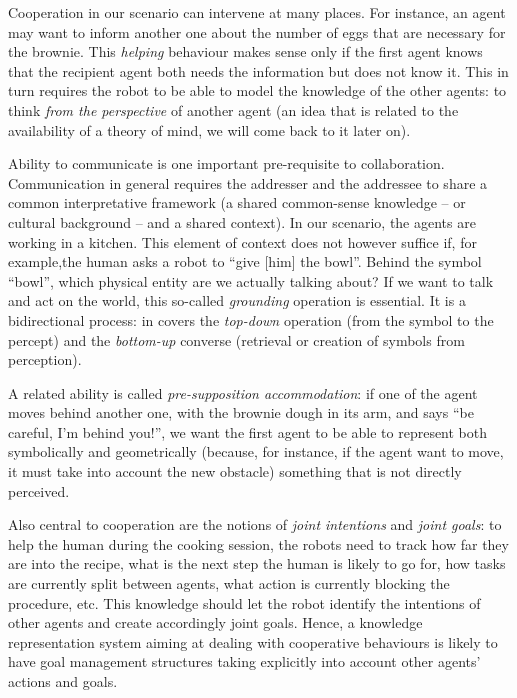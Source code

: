 Cooperation in our scenario can intervene at many places. For instance, an
agent may want to inform another one about the number of eggs that are
necessary for the brownie. This \emph{helping} behaviour makes sense only if
the first agent knows that the recipient agent both needs the information but
does not know it. This in turn requires the robot to be able to model the
knowledge of the other agents: to think \emph{from the perspective} of another
agent (an idea that is related to the availability of a theory of mind, we will
come back to it later on).

Ability to communicate is one important pre-requisite to collaboration.
Communication in general requires the addresser and the addressee to share a
common interpretative framework (a shared common-sense knowledge -- or cultural
background -- and a shared context). In our scenario, the agents are working in
a kitchen. This element of context does not however suffice if, for example,the 
human asks a robot to ``give {[him]} the bowl''. Behind the symbol
``bowl'', which physical entity are we actually talking about? If we want to
talk and act on the world, this so-called \emph{grounding} operation is
essential. It is a bidirectional process: in covers the {\it top-down}
operation (from the symbol to the percept) and the {\it bottom-up} converse
(retrieval or creation of symbols from perception).

A related ability is called \emph{pre-supposition accommodation}: if one of the
agent moves behind another one, with the brownie dough in its arm, and says
``be careful, I'm behind you!'', we want the first agent to be able to
represent both symbolically and geometrically (because, for instance, if the
agent want to move, it must take into account the new obstacle) something that
is not directly perceived.

Also central to cooperation are the notions of \emph{joint intentions} and
\emph{joint goals}: to help the human during the cooking session, the robots
need to track how far they are into the recipe, what is the next step the human
is likely to go for, how tasks are currently split between agents, what action
is currently blocking the procedure, etc. This knowledge should let the robot
identify the intentions of other agents and create accordingly joint goals.
Hence, a knowledge representation system aiming at dealing with cooperative
behaviours is likely to have goal management structures taking explicitly into
account other agents' actions and goals.

